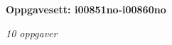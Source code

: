 \centerline{\bf Oppgavesett: i00851no-i00860no}
\vskip 10pt
\centerline{\it 10 oppgaver}\vskip 10pt
\vskip 10pt
